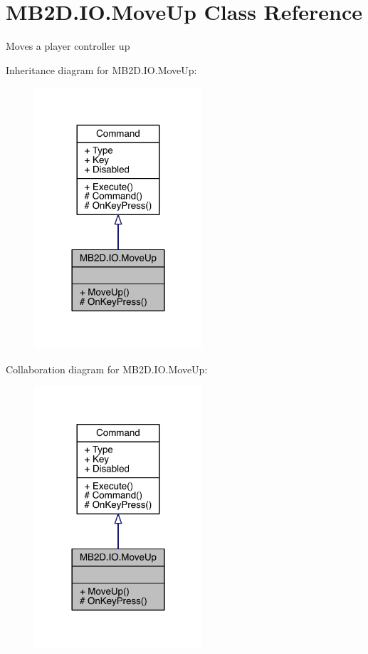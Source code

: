 \hypertarget{class_m_b2_d_1_1_i_o_1_1_move_up}{}\section{M\+B2\+D.\+I\+O.\+Move\+Up Class Reference}
\label{class_m_b2_d_1_1_i_o_1_1_move_up}


Moves a player controller up  




Inheritance diagram for M\+B2\+D.\+I\+O.\+Move\+Up\+:\nopagebreak
\begin{figure}[H]
\begin{center}
\leavevmode
\includegraphics[width=177pt]{class_m_b2_d_1_1_i_o_1_1_move_up__inherit__graph}
\end{center}
\end{figure}


Collaboration diagram for M\+B2\+D.\+I\+O.\+Move\+Up\+:\nopagebreak
\begin{figure}[H]
\begin{center}
\leavevmode
\includegraphics[width=177pt]{class_m_b2_d_1_1_i_o_1_1_move_up__coll__graph}
\end{center}
\end{figure}
